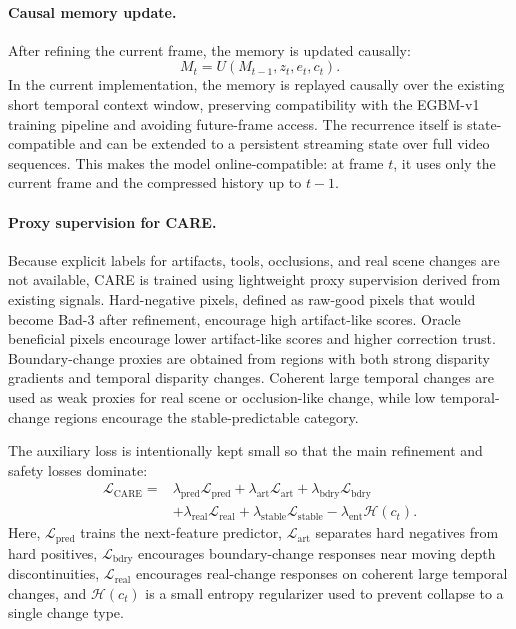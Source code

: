 \documentclass[11pt,a4paper]{article}
\begin{document}
\paragraph{Causal memory update.}
After refining the current frame, the memory is updated causally:
\begin{equation}
    M_t = U(M_{t-1}, z_t, e_t, c_t).
\end{equation}
In the current implementation, the memory is replayed causally over the existing
short temporal context window, preserving compatibility with the EGBM-v1
training pipeline and avoiding future-frame access. The recurrence itself is
state-compatible and can be extended to a persistent streaming state over full
video sequences. This makes the model online-compatible: at frame $t$, it uses
only the current frame and the compressed history up to $t-1$.

\paragraph{Proxy supervision for CARE.}
Because explicit labels for artifacts, tools, occlusions, and real scene changes
are not available, CARE is trained using lightweight proxy supervision derived
from existing signals. Hard-negative pixels, defined as raw-good pixels that
would become Bad-3 after refinement, encourage high artifact-like scores. Oracle
beneficial pixels encourage lower artifact-like scores and higher correction
trust. Boundary-change proxies are obtained from regions with both strong
disparity gradients and temporal disparity changes. Coherent large temporal
changes are used as weak proxies for real scene or occlusion-like change, while
low temporal-change regions encourage the stable-predictable category.

The auxiliary loss is intentionally kept small so that the main refinement and
safety losses dominate:
\begin{equation}
\begin{aligned}
    \mathcal{L}_{\mathrm{CARE}} =
    &\lambda_{\mathrm{pred}}\mathcal{L}_{\mathrm{pred}}
    + \lambda_{\mathrm{art}}\mathcal{L}_{\mathrm{art}}
    + \lambda_{\mathrm{bdry}}\mathcal{L}_{\mathrm{bdry}} \\
    &+ \lambda_{\mathrm{real}}\mathcal{L}_{\mathrm{real}}
    + \lambda_{\mathrm{stable}}\mathcal{L}_{\mathrm{stable}}
    - \lambda_{\mathrm{ent}}\mathcal{H}(c_t).
\end{aligned}
\end{equation}
Here, $\mathcal{L}_{\mathrm{pred}}$ trains the next-feature predictor,
$\mathcal{L}_{\mathrm{art}}$ separates hard negatives from hard positives,
$\mathcal{L}_{\mathrm{bdry}}$ encourages boundary-change responses near moving
depth discontinuities, $\mathcal{L}_{\mathrm{real}}$ encourages real-change
responses on coherent large temporal changes, and $\mathcal{H}(c_t)$ is a small
entropy regularizer used to prevent collapse to a single change type.
\end{document}
